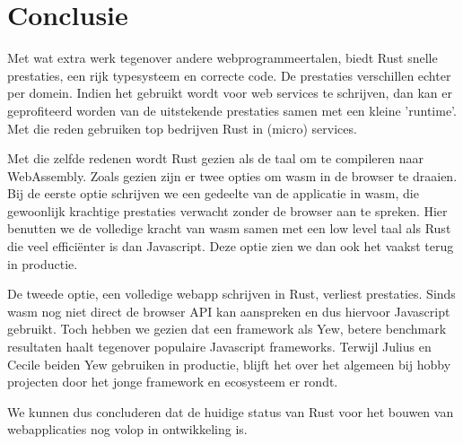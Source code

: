 \chapter{Conclusie}

Met wat extra werk tegenover andere webprogrammeertalen, biedt Rust snelle prestaties, een rijk
typesysteem en correcte code. De prestaties verschillen echter per domein. Indien het gebruikt wordt
voor web services te schrijven, dan kan er geprofiteerd worden van de uitstekende prestaties samen
met een kleine 'runtime'. Met die reden gebruiken top bedrijven Rust in (micro) services.

Met die zelfde redenen wordt Rust gezien als de taal om te compileren naar WebAssembly. Zoals gezien
zijn er twee opties om wasm in de browser te draaien. Bij de eerste optie schrijven we een gedeelte
van de applicatie in wasm, die gewoonlijk krachtige prestaties verwacht zonder de browser aan te
spreken. Hier benutten we de volledige kracht van wasm samen met een low level taal als Rust
die veel efficiënter is dan Javascript. Deze optie zien we dan ook het vaakst terug in productie.

De tweede optie, een volledige webapp schrijven in Rust, verliest prestaties. Sinds wasm nog niet
direct de browser API kan aanspreken en dus hiervoor Javascript gebruikt. Toch hebben we gezien dat
een framework als Yew, betere benchmark resultaten haalt tegenover populaire Javascript frameworks.
Terwijl Julius en Cecile beiden Yew gebruiken in productie, blijft het over het algemeen bij hobby
projecten door het jonge framework en ecosysteem er rondt.

We kunnen dus concluderen dat de huidige status van Rust voor het bouwen van webapplicaties nog
volop in ontwikkeling is.
